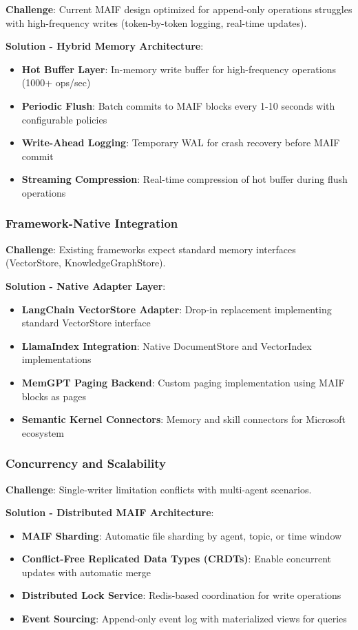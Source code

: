 \documentclass[conference]{IEEEtran}
\begin{document}
\textbf{Challenge}: Current MAIF design optimized for append-only operations struggles with high-frequency writes (token-by-token logging, real-time updates).

\textbf{Solution - Hybrid Memory Architecture}:
\begin{itemize}[leftmargin=*]
\item \textbf{Hot Buffer Layer}: In-memory write buffer for high-frequency operations (1000+ ops/sec)
\item \textbf{Periodic Flush}: Batch commits to MAIF blocks every 1-10 seconds with configurable policies
\item \textbf{Write-Ahead Logging}: Temporary WAL for crash recovery before MAIF commit
\item \textbf{Streaming Compression}: Real-time compression of hot buffer during flush operations
\end{itemize}

\subsubsection{Framework-Native Integration}

\textbf{Challenge}: Existing frameworks expect standard memory interfaces (VectorStore, KnowledgeGraphStore).

\textbf{Solution - Native Adapter Layer}:
\begin{itemize}[leftmargin=*]
\item \textbf{LangChain VectorStore Adapter}: Drop-in replacement implementing standard VectorStore interface
\item \textbf{LlamaIndex Integration}: Native DocumentStore and VectorIndex implementations
\item \textbf{MemGPT Paging Backend}: Custom paging implementation using MAIF blocks as pages
\item \textbf{Semantic Kernel Connectors}: Memory and skill connectors for Microsoft ecosystem
\end{itemize}

\subsubsection{Concurrency and Scalability}

\textbf{Challenge}: Single-writer limitation conflicts with multi-agent scenarios.

\textbf{Solution - Distributed MAIF Architecture}:
\begin{itemize}[leftmargin=*]
\item \textbf{MAIF Sharding}: Automatic file sharding by agent, topic, or time window
\item \textbf{Conflict-Free Replicated Data Types (CRDTs)}: Enable concurrent updates with automatic merge
\item \textbf{Distributed Lock Service}: Redis-based coordination for write operations
\item \textbf{Event Sourcing}: Append-only event log with materialized views for queries
\end{itemize}
\end{document}
